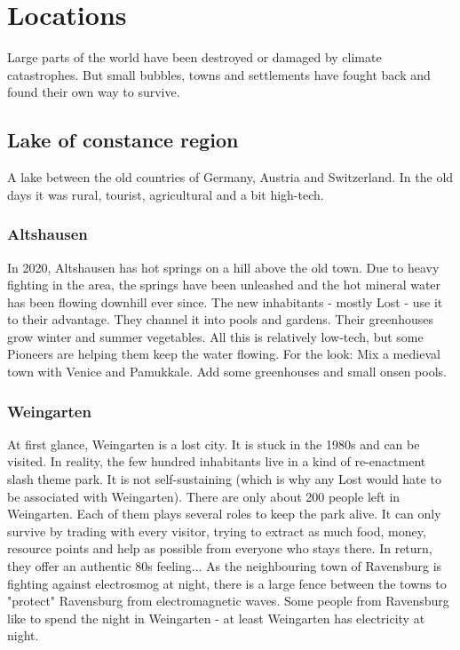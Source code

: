 \chapter{Locations}

Large parts of the world have been destroyed or damaged by climate catastrophes. But small bubbles, towns and settlements have fought back and found their own way to survive.

\section{Lake of constance region}

A lake between the old countries of Germany, Austria and Switzerland.
In the old days it was rural, tourist, agricultural and a bit high-tech.

\subsection{Altshausen}
\label{subsec:Altshausen}

In 2020, Altshausen has hot springs on a hill above the old town. Due to heavy fighting in the area, the springs have been unleashed and the hot mineral water has been flowing downhill ever since. The new inhabitants - mostly Lost - use it to their advantage.
They channel it into pools and gardens. Their greenhouses grow winter and summer vegetables.
All this is relatively low-tech, but some Pioneers are helping them keep the water flowing. For the look: Mix a medieval town with Venice and Pamukkale. Add some greenhouses and small onsen pools.


\subsection{Weingarten}
\label{subsec:Weingarten}

At first glance, Weingarten is a lost city. It is stuck in the 1980s and can be visited. In reality, the few hundred inhabitants live in a kind of re-enactment slash theme park. It is not self-sustaining (which is why any Lost would hate to be associated with Weingarten).
There are only about 200 people left in Weingarten. Each of them plays several roles to keep the park alive.
It can only survive by trading with every visitor, trying to extract as much food, money, resource points and help as possible from everyone who stays there. In return, they offer an authentic 80s feeling...
As the neighbouring town of Ravensburg is fighting against electrosmog at night, there is a large fence between the towns to "protect" Ravensburg from electromagnetic waves.
Some people from Ravensburg like to spend the night in Weingarten - at least Weingarten has electricity at night.

